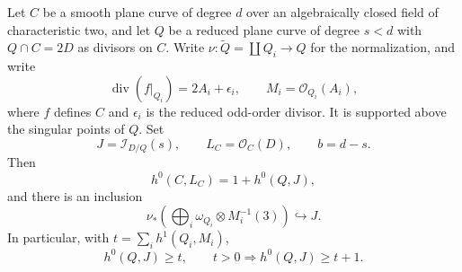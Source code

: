 \begin{lemma}
\label{lem:contact-conductor}
Let $C$ be a smooth plane curve of degree $d$ over an algebraically
closed field of characteristic two, and let $Q$ be a reduced plane
curve of degree $s<d$ with $Q\cap C=2D$ as divisors on $C$.
Write $\nu:\widetilde Q=\coprod Q_i\to Q$ for the normalization,
and write
\[
 \operatorname{div}(f|_{Q_i})=2A_i+\epsilon_i,
 \qquad M_i=\mathcal O_{Q_i}(A_i),
\]
where $f$ defines $C$ and $\epsilon_i$ is the reduced odd-order
divisor.  It is supported above the singular points of $Q$.
Set
\[
 J=\mathcal I_{D/Q}(s),\qquad
 L_C=\mathcal O_C(D),\qquad
 b=d-s.
\]
Then
\begin{equation}\label{eq:general-contact-reciprocity}
 h^0(C,L_C)=1+h^0(Q,J),
\end{equation}
and there is an inclusion
\begin{equation}\label{eq:conductor-section-inclusion}
 \nu_*\left(\bigoplus_i
       \omega_{Q_i}\otimes M_i^{-1}(3)\right)\hookrightarrow J.
\end{equation}
In particular, with $t=\sum_i h^1(Q_i,M_i)$,
\begin{equation}\label{eq:contact-h1-cancellation}
 h^0(Q,J)\ge t,
 \qquad t>0\Longrightarrow h^0(Q,J)\ge t+1.
\end{equation}
\end{lemma}

